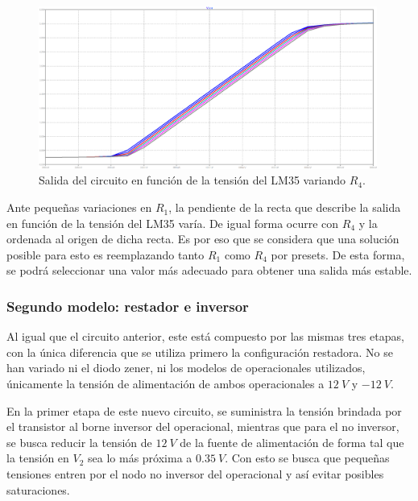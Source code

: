 \begin{figure}[H]
	\centering
	\includegraphics[width=0.99\textwidth]{Ejercicio6/Imagenes/StepR4-M1.png}
	\caption{Salida del circuito en función de la tensión del LM35 variando $R_4$.}
	\label{fig:r4-M1}
\end{figure}

Ante pequeñas variaciones en $R_1$, la pendiente de la recta que describe la salida en función de la tensión del LM35 varía. De igual forma ocurre con $R_4$ y la ordenada al origen de dicha recta. Es por eso que se considera que una solución posible para esto es reemplazando tanto $R_1$ como $R_4$ por presets. De esta forma, se podrá seleccionar una valor más adecuado para obtener una salida más estable.

\subsubsection{Segundo modelo: restador e inversor}

Al igual que el circuito anterior, este está compuesto por las mismas tres etapas, con la única diferencia que se utiliza primero la configuración restadora. No se han variado ni el diodo zener, ni los modelos de operacionales utilizados, únicamente la tensión de alimentación de ambos operacionales a $12 \ V$ y $-12 \ V$.

En la primer etapa de este nuevo circuito, se suministra la tensión brindada por el transistor al borne inversor del operacional, mientras que para el no inversor, se busca reducir la tensión de $12 \ V$ de la fuente de alimentación de forma tal que la tensión en $V_2$ sea lo más próxima a $0.35 \ V$. Con esto se busca que pequeñas tensiones entren por el nodo no inversor del operacional y así evitar posibles saturaciones.

